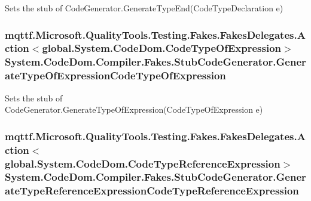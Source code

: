 Sets the stub of Code\-Generator.\-Generate\-Type\-End(\-Code\-Type\-Declaration e)

\hypertarget{class_system_1_1_code_dom_1_1_compiler_1_1_fakes_1_1_stub_code_generator_a320539887fa3fa3fcafe1f7d83fb25b9}{
\subsubsection[{Generate\-Type\-Of\-Expression\-Code\-Type\-Of\-Expression}]{\setlength{\rightskip}{0pt plus 5cm}mqttf.\-Microsoft.\-Quality\-Tools.\-Testing.\-Fakes.\-Fakes\-Delegates.\-Action$<$global.\-System.\-Code\-Dom.\-Code\-Type\-Of\-Expression$>$ System.\-Code\-Dom.\-Compiler.\-Fakes.\-Stub\-Code\-Generator.\-Generate\-Type\-Of\-Expression\-Code\-Type\-Of\-Expression}}\label{class_system_1_1_code_dom_1_1_compiler_1_1_fakes_1_1_stub_code_generator_a320539887fa3fa3fcafe1f7d83fb25b9}


Sets the stub of Code\-Generator.\-Generate\-Type\-Of\-Expression(\-Code\-Type\-Of\-Expression e)

\hypertarget{class_system_1_1_code_dom_1_1_compiler_1_1_fakes_1_1_stub_code_generator_a0c91e3d432b8dfcd9fa885319c08b5e9}{
\subsubsection[{Generate\-Type\-Reference\-Expression\-Code\-Type\-Reference\-Expression}]{\setlength{\rightskip}{0pt plus 5cm}mqttf.\-Microsoft.\-Quality\-Tools.\-Testing.\-Fakes.\-Fakes\-Delegates.\-Action$<$global.\-System.\-Code\-Dom.\-Code\-Type\-Reference\-Expression$>$ System.\-Code\-Dom.\-Compiler.\-Fakes.\-Stub\-Code\-Generator.\-Generate\-Type\-Reference\-Expression\-Code\-Type\-Reference\-Expression}}\label{class_system_1_1_code_dom_1_1_compiler_1_1_fakes_1_1_stub_code_generator_a0c91e3d432b8dfcd9fa885319c08b5e9}


